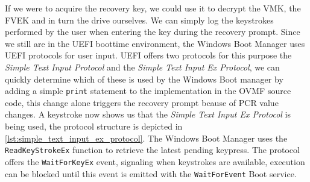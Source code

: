 If we were to acquire the recovery key, we could use it to decrypt the \ac{VMK}, the \ac{FVEK} and in turn the drive ourselves. We can simply log the keystrokes performed by the user when entering the key during the recovery prompt. Since we still are in the \ac{UEFI} boottime environment, the Windows Boot Manager uses \ac{UEFI} protocols for user input. \ac{UEFI} offers two protocols for this purpose the \emph{Simple Text Input Protocol} and the \emph{Simple Text Input Ex Protocol}, we can quickly determine which of these is used by the Windows Boot manager by adding a simple \lstinline{print} statement to the implementation in the \ac{OVMF} source code, this change alone triggers the recovery prompt bcause of \ac{PCR} value changes. A keystroke now shows us that the \emph{Simple Text Input Ex Protocol} is being used, the protocol structure is depicted in \autoref{lst:simple_text_input_ex_protocol}. The Windows Boot Manager uses the \lstinline{ReadKeyStrokeEx} function to retrieve the latest pending keypress. The protocol offers the \lstinline{WaitForKeyEx} event, signaling when keystrokes are available, execution can be blocked until this event is emitted with the \lstinline{WaitForEvent} Boot service.





